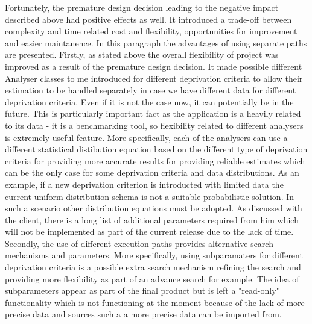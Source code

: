 \documentclass{l3proj}
\begin{document}
Fortunately, the premature design decision leading to the negative impact described above had positive effects as well. It introduced a trade-off between complexity and time related cost and flexibility, opportunities for improvement and easier maintanence. In this paragraph the advantages of using separate paths are presented. Firstly, as stated above the overall flexibility of project was improved as a result of the premature design decision. It made possible different Analyser classes to me introduced for different deprivation criteria to allow their estimation to be handled separately in case we have different data for different deprivation criteria. Even if it is not the case now, it can potentially be in the future. This is particularly important fact as the application is a heavily related to its data - it is a benchmarking tool, so flexibility related to different analysers is extremely useful feature. More specifically, each of the analysers can use a different statistical distibution equation based on the different type of deprivation criteria for providing more accurate results for providing reliable estimates which can be the only case for some deprivation criteria and data distributions. As an example, if a new deprivation criterion is introducted with limited data the current uniform distribution schema is not a suitable probabilistic solution. In such a scenario other distribution equations must be adopted. As discussed with the client, there is a long list of additional parameters required from him which will not be implemented as part of the current release due to the lack of time. Secondly, the use of different execution paths provides alternative search mechanisms and parameters. More specifically, using subparamaters for different deprivation criteria is a possible extra search mechanism refining the search and providing more flexibility as part of an advance search for example. The idea of subparameters appear as part of the final product but is left a "read-only" functionality which is not functioning at the moment because of the lack of more precise data and sources such a a more precise data can be imported from.
\end{document}
